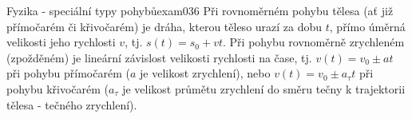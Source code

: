 \begin{mathexam}{Fyzika - speciální typy pohybů}{exam036}
  Při rovnoměrném pohybu tělesa (ať již přímočarém či křivočarém) je dráha, kterou těleso urazí za
  dobu \(t\), přímo úměrná velikosti jeho rychlosti \(v\), tj. \(s(t) = s_0 + vt\). Při pohybu
  rovnoměrně zrychleném (zpožděném) je lineární závislost velikosti rychlosti na čase, tj. \(v(t) =
  v_0 \pm at\) při pohybu přímočarém (\(a\) je velikost zrychlení), nebo \(v(t) = v_0 \pm a_\tau t\)
  při pohybu křivočarém (\(a_\tau\) je velikost průmětu zrychlení do směru tečny k trajektorii
  tělesa - tečného zrychlení).
\end{mathexam}